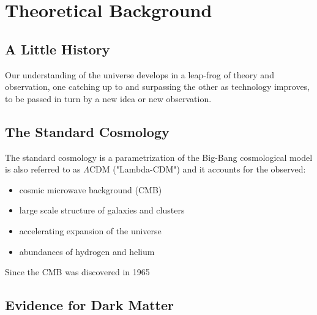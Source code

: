 \chapter{Theoretical Background }\label{theory} %


\section{A Little History}
Our understanding of the universe develops in a leap-frog of theory and observation, one catching up to and surpassing the other as technology improves, to be passed in turn by a new idea or new observation. 


\section{The Standard Cosmology}
The standard cosmology is a parametrization of the Big-Bang cosmological model is also referred to as $\Lambda$CDM ("Lambda-CDM") and it accounts for the observed:

\begin{itemize}
\item cosmic microwave background (CMB)
\item large scale structure of galaxies and clusters
\item accelerating expansion of the universe
\item abundances of hydrogen and helium
\end{itemize}

Since the CMB was discovered in 1965 

\section{Evidence for Dark Matter}
